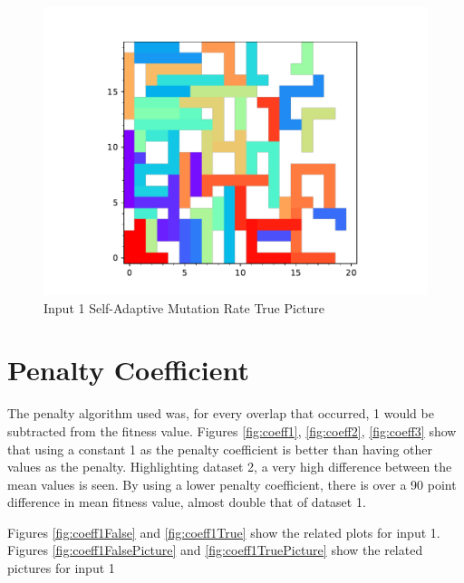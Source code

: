 \documentclass[times]{article}
\begin{document}
	\begin{figure}
		\caption{Input 1 Self-Adaptive Mutation Rate True Picture}
		\label{fig:mutTruePicture}
		\includegraphics[width=\textwidth]{../graphs/picture/1061}
	\end{figure}


	\section{Penalty Coefficient}
	The penalty algorithm used was, for every overlap that occurred, 1 would be subtracted from the fitness value. Figures \ref{fig:coeff1}, \ref{fig:coeff2}, \ref{fig:coeff3} show that using a constant 1 as the penalty coefficient is better than having other values as the penalty. Highlighting dataset 2, a very high difference between the mean values is seen. By using a lower penalty coefficient, there is over a 90 point difference in mean fitness value, almost double that of dataset 1.

	Figures \ref{fig:coeff1False} and \ref{fig:coeff1True} show the related plots for input 1. Figures \ref{fig:coeff1FalsePicture} and \ref{fig:coeff1TruePicture} show the related pictures for input 1
\end{document}
